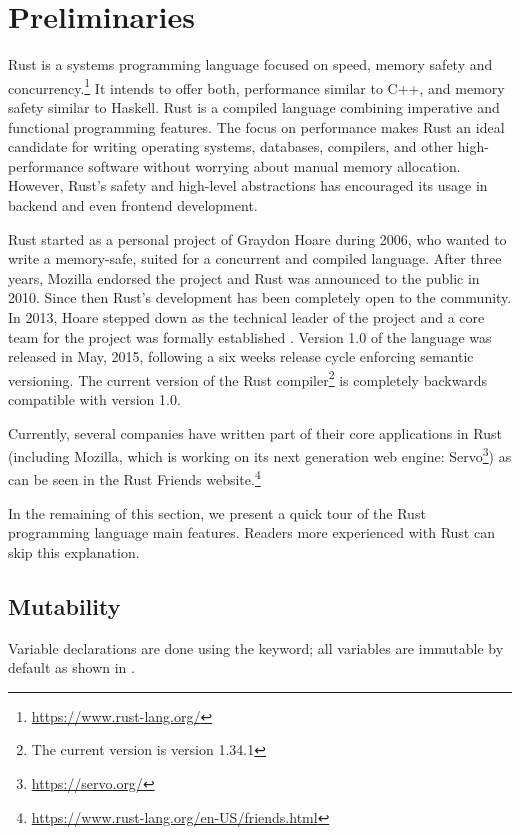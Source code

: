 \chapter{Preliminaries}

\label{chap:preliminaries}

Rust is a systems programming language focused on speed, memory safety and
concurrency.\footnote{\url{https://www.rust-lang.org/}}  It intends to offer
both, performance similar to C++, and memory safety similar to Haskell. Rust is a
compiled language combining imperative and functional programming features. The
focus on performance makes Rust an ideal candidate for writing operating
systems, databases, compilers, and other high-performance software without
worrying about manual memory allocation. However, Rust's safety and high-level
abstractions has encouraged its usage in backend and even frontend development. 

Rust started as a personal project of Graydon Hoare during 2006, who wanted to
write a memory-safe, suited for a concurrent and compiled language. After three
years, Mozilla endorsed the project and Rust was announced to the public in
2010. Since then Rust's development has been completely open to the community.
In 2013, Hoare stepped down as the technical leader of the project and a core
team for the project was formally established \cite{steve_acm}. Version 1.0 of
the language was released in May, 2015, following a six weeks release cycle
enforcing semantic versioning. The current version of the Rust
compiler\footnote{The current version is version 1.34.1} is completely
backwards compatible with version 1.0.

Currently, several companies have written part of their core
applications in Rust (including Mozilla, which is working on its next generation web
engine: Servo\footnote{\url{https://servo.org/}}) as can be seen in the
Rust Friends website.\footnote{\url{https://www.rust-lang.org/en-US/friends.html}}

In the remaining of this section, we present a quick tour of the Rust
programming language main features. Readers more experienced with Rust can skip
this explanation.

\section{Mutability}

Variable declarations are done using the  keyword; all
variables are immutable by default as shown in .


